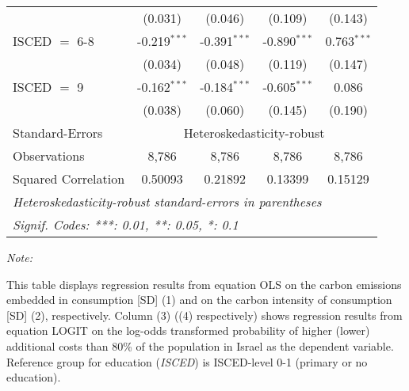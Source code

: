 \begin{table}[htbp!]
\begin{adjustbox}{width = 1\textwidth, max height = 0.95\textheight, center}
\begin{threeparttable}[b]
\begin{tabular}{lcccc}
                                 & (0.031)            & (0.046)            & (0.109)        & (0.143)\\   
            ISCED $=$ 6-8        & -0.219$^{***}$     & -0.391$^{***}$     & -0.890$^{***}$ & 0.763$^{***}$\\   
                                 & (0.034)            & (0.048)            & (0.119)        & (0.147)\\   
            ISCED $=$ 9          & -0.162$^{***}$     & -0.184$^{***}$     & -0.605$^{***}$ & 0.086\\   
                                 & (0.038)            & (0.060)            & (0.145)        & (0.190)\\   
            \midrule 
            Standard-Errors & \multicolumn{4}{c}{Heteroskedasticity-robust} \\ 
            Observations         & 8,786              & 8,786              & 8,786          & 8,786\\  
            Squared Correlation  & 0.50093            & 0.21892            & 0.13399        & 0.15129\\  
            \midrule \midrule
            \multicolumn{5}{l}{\emph{Heteroskedasticity-robust standard-errors in parentheses}}\\
            \multicolumn{5}{l}{\emph{Signif. Codes: ***: 0.01, **: 0.05, *: 0.1}}\\
         \end{tabular}
         
         \begin{tablenotes}\item \medskip \textit{Note:}
            \item This table displays regression results from equation OLS on the carbon emissions embedded in consumption [SD] (1) and on the carbon intensity of consumption [SD] (2), respectively. 
                                      Column (3) ((4) respectively) shows regression results from equation LOGIT on the log-odds transformed probability of higher (lower) additional costs than 80\% of the population in Israel as the dependent variable. Reference group for education (\textit{ISCED}) is ISCED-level 0-1 (primary or no education).
         \end{tablenotes}
      \end{threeparttable}
   \end{adjustbox}
\end{table}


